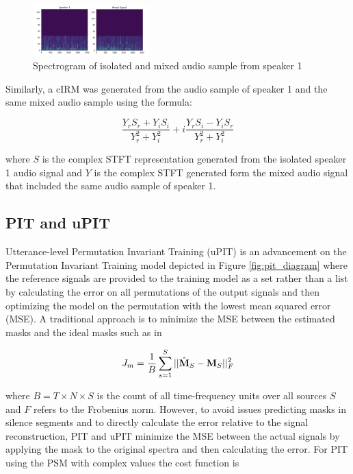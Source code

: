 \documentclass[journal, a4paper]{IEEEtran}
\begin{document}
\begin{figure}[h!]
    \centering  
     \caption{\label{fig:spec_speaker_1}Spectrogram of isolated and mixed audio sample from speaker 1}  
    \includegraphics[width=0.4\textwidth]{cIRM_same.png}  
\end{figure}

Similarly, a cIRM was generated from the audio sample of speaker 1 and the same mixed audio sample using the formula:

\begin{equation}
\dfrac{Y_r S_r + Y_i S_i}{Y_r^2 + Y_i^2} +
i\dfrac{Y_r S_i - Y_i S_r}{Y_r^2 + Y_i^2}
\end{equation}

\begin{flushleft}
where $S$ is the complex STFT representation generated from the isolated speaker 1 audio signal and $Y$ is the complex STFT generated form the mixed audio signal that included the same audio sample of speaker 1.\cite{DBLP:journals/corr/abs-1708-07524}
\end{flushleft}

\subsection{PIT and uPIT}

Utterance-level Permutation Invariant Training (uPIT) is an advancement on the Permutation Invariant Training model depicted in Figure \ref{fig:pit_diagram} where the reference signals are provided to the training model as a set rather than a list by calculating the error on all permutations of the output signals and then optimizing the model on the permutation with the lowest mean squared error (MSE). A traditional approach is to minimize the MSE between the estimated masks and the ideal masks such as in

\begin{equation}
J_m = \dfrac{1}{B} \sum_{s=1}^S || \Hat{\mathbf{M}}_S - \mathbf{M}_S ||^2_F
\end{equation}

where $B = T \times N \times S$ is the count of all time-frequency units over all sources $S$ and $F$ refers to the Frobenius norm. However, to avoid issues predicting masks in silence segments and to directly calculate the error relative to the signal reconstruction, PIT and uPIT minimize the MSE between the actual signals by applying the mask to the original spectra and then calculating the error. For PIT using the PSM with complex values the cost function is
\end{document}
